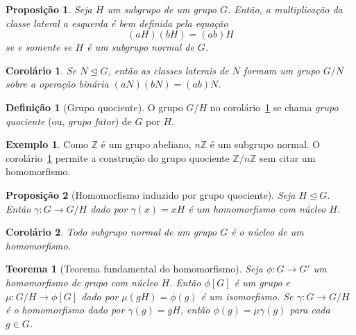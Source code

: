 \documentclass[a4paper,12pt]{report}
\theoremstyle{plain}
\newtheorem{teorema}{Teorema}[section]
\newtheorem{proposicao}{Proposição}[section]
\newtheorem{corolario}{Corolário}[section]
\theoremstyle{definition}
\newtheorem{definicao}{Definição}[section]
\newtheorem{exemplo}{Exemplo}[section]
\begin{document}
\begin{proposicao}
	Seja $H$ um subgrupo de um grupo $G$. Então, a multiplicação da classe lateral a esquerda é bem definida pela equação
	$$(aH)(bH) = (ab)H$$
	se e somente se $H$ é um subgrupo normal de $G$.
\end{proposicao}

\begin{corolario}\label{cor:factorGroup}
	Se $N\trianglelefteq G$, então as classes laterais de $N$ formam um grupo $G/N$ sobre a operação binária $(aN)(bN) = (ab)N$.
\end{corolario}

\begin{definicao}[Grupo quociente]
	O grupo $G/H$ no corolário~\ref{cor:factorGroup} se chama \emph{grupo quociente} (ou, \emph{grupo fator}) de $G$ por $H$.
\end{definicao}

\begin{exemplo}
	Como $\mathbb{Z}$ é um grupo abeliano, $n\mathbb{Z}$ é um subgrupo normal. O corolário~\ref{cor:factorGroup} permite a construção do grupo quociente $\mathbb{Z}/n\mathbb{Z}$ sem citar um homomorfismo.
\end{exemplo}

\begin{proposicao}[Homomorfismo induzido por grupo quociente]
	Seja $H\trianglelefteq G$. Então $\gamma: G\longrightarrow G/H$ dado por $\gamma(x) = xH$ é um homomorfismo com núcleo $H$.
\end{proposicao}

\begin{corolario}
	Todo subgrupo normal de um grupo \(G\) é o núcleo
	de um homomorfismo.
\end{corolario}

\begin{teorema}[Teorema fundamental do homomorfismo]
	Seja $\phi: G\longrightarrow G'$ um homomorfismo de grupo com núcleo $H$. Então $\phi[G]$ é um grupo e $\mu: G/H \longrightarrow \phi[G]$ dado por $\mu(gH) = \phi(g)$ é um isomorfismo. Se $\gamma: G\longrightarrow G/H$ é o homomorfismo dado por $\gamma(g) = gH$, então $\phi(g) = \mu\gamma(g)$ para cada $g\in G$.
\end{teorema}



\end{document}
